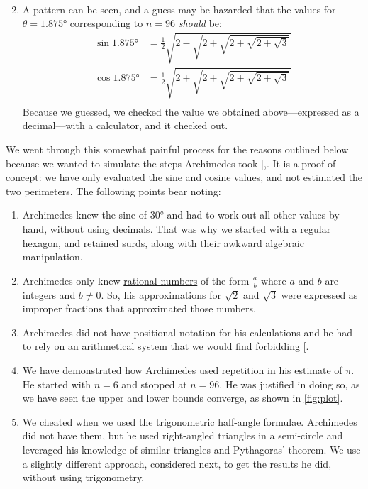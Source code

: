 \documentclass[
  a4paper,
]{article}
\begin{document}
\begin{enumerate}
\[\begin{aligned}
  \end{aligned}
  \]
\item
  A pattern can be seen, and a guess may be hazarded that the values for
  \(\theta = 1.875°\) corresponding to \(n=96\) \emph{should} be: \[
  \begin{aligned}
  \sin 1.875° &= \frac{1}{2}\sqrt{2 - \sqrt{2 + \sqrt{2 + \sqrt{2 + \sqrt{3}}}}}\\
  \cos 1.875° &= \frac{1}{2}\sqrt{2 + \sqrt{2 + \sqrt{2 + \sqrt{2 + \sqrt{3}}}}}\\
  \end{aligned}
  \] Because we guessed, we checked the value we obtained
  above---expressed as a decimal---with a calculator, and it checked
  out.
\end{enumerate}

We went through this somewhat painful process for the reasons outlined
below because we wanted to simulate the steps Archimedes took
{[},\citeproc{ref-damini-dhar-2020}{3}{]}.
It is a proof of concept: we have only evaluated the sine and cosine
values, and not estimated the two perimeters. The following points bear
noting:

\begin{enumerate}
\def\labelenumi{(\alph{enumi})}
\item
  Archimedes knew the sine of 30° and had to work out all other values
  by hand, without using decimals. That was why we started with a
  regular hexagon, and retained
  \href{https://www.thefreedictionary.com/surds}{surds}, along with
  their awkward algebraic manipulation.
\item
  Archimedes only knew
  \href{https://www.britannica.com/science/rational-number}{rational
  numbers} of the form \(\frac{a}{b}\) where \(a\) and \(b\) are
  integers and \(b \neq 0\). So, his approximations for \(\sqrt{2}\) and
  \(\sqrt{3}\) were expressed as improper fractions that approximated
  those numbers.
\item
  Archimedes did not have positional notation for his calculations and
  he had to rely on an arithmetical system that we would find forbidding
  {[}\citeproc{ref-heath2002}{4}{]}.
\item
  We have demonstrated how Archimedes used repetition in his estimate of
  \(\pi\). He started with \(n = 6\) and stopped at \(n=96\). He was
  justified in doing so, as we have seen the upper and lower bounds
  converge, as shown in \cref{fig:plot}.
\item
  We cheated when we used the trigonometric half-angle formulae.
  Archimedes did not have them, but he used right-angled triangles in a
  semi-circle and leveraged his knowledge of similar triangles and
  Pythagoras' theorem. We use a slightly different approach, considered
  next, to get the results he did, without using trigonometry.
\end{enumerate}
\end{document}
